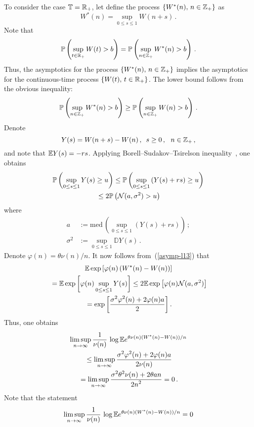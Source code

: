 \begin{multicols}{2}
To consider the case  $\mathbb{T}=\mathbb R_+$, let  define the process
$\{W^*(n),\,n \in \mathbb{Z}_+\}$ as
$$
W^*(n)=\sup\limits_{0 \le s \le 1} W(n+s)\,.
$$
Note that
$$
\mathbb{P} \left( \sup\limits_{t \in \mathbb R_+}W(t) >b\right)=
\mathbb{P} \left( \sup\limits_{n \in \mathbb{Z}_+} W^*(n) >b \right)\,.
$$
Thus, the asymptotics for the process $\{W^*(n),\, n \in \mathbb{Z}_+\}$
implies  the asymptotics for the continuous-time process $\{W(t),\,
t \in \mathbb R_+\}$. The lower bound  follows from the  obvious inequality:
$$
\mathbb{P}\left(\sup\limits_{n \in \mathbb{Z}_+} W^*(n)>b\right) \ge
\mathbb{P}\left(\sup\limits_{n \in \mathbb{Z}_+} W(n)>b\right)\,.
$$
Denote
$$
Y(s)=W(n+s)-W(n)\,, \enskip s \geq 0\,,\ \ n \in \Z_+\,,
$$
 and note that $\mathbb E Y(s)=-rs$.  Applying  Borell--Sudakov--Tsirelson
 inequality~\cite{Adler, Debicki}, one obtains
\begin{multline}
\mathbb{P} \left( \sup\limits_{0 \leq s \leq 1} Y(s) \geq u \right) \leq
\mathbb{P} \left( \sup\limits_{0 \leq s \leq 1} \left(Y(s)
+rs \right)\geq u \right)\\
{}\leq 2 \mathbb{P}\left( \mathcal{N}(a,\sigma^2)>u \right)
\label{asymp-l13}
\end{multline}
where
\begin{align*}
a&:=\mathrm{med}\, \left( \sup\limits_{0 \leq s \leq 1}\left(Y(s) +rs
\right)\right)\,;\\
\sigma^2&:=\sup\limits_{0 \leq s \leq 1} \mathbb{D} Y(s)\,.
\end{align*}
Denote  $\varphi(n)=\theta\nu(n)/n$. It now follows from~(\ref{asymp-l13})
 that
\begin{multline*}
\mathbb E \exp\left[\varphi(n)\left(W^*(n)-W(n)\right)\right]\\
{}=
\mathbb E \exp\left[\varphi(n)\sup\limits_{0 \leq s \leq 1}Y(s)\right]
\leq 2 \mathbb E \exp\left[\varphi(n) \mathcal{N}(a,\sigma^2)\right]\\
{}=\exp\left[\displaystyle\frac{\displaystyle \sigma^2\varphi^2(n)+2\varphi(n) a\mathstrut}{\displaystyle 2\mathstrut}\right].
\end{multline*}
Thus, one obtains
\begin{multline}
\limsup\limits_{n \to \infty}\displaystyle\frac{\displaystyle 1\mathstrut}{\displaystyle \nu(n)\mathstrut}\,\log \mathbb E
e^{\theta\nu(n)\left(W^*(n)-W(n)\right)/n} \\
{}\leq \limsup\limits_{n \to \infty}
\displaystyle\frac{\displaystyle \sigma^2\varphi^2(n)+2\varphi(n) a\mathstrut}{\displaystyle 2\nu(n)\mathstrut}\\
{}= \limsup\limits_{n \to \infty} \displaystyle\frac{\displaystyle \sigma^2\theta^2\nu(n)+2\theta an\mathstrut}{\displaystyle 2n^2\mathstrut}=0\,.
\label{Duff2}
\end{multline}
Note that the statement
\begin{equation}
\limsup\limits_{n \to \infty}\fr{1}{\nu(n)}\,\log \E
e^{\theta\nu(n)\left(W^*(n)-W(n)\right)/n}=0

\end{equation}
\end{multicols}
